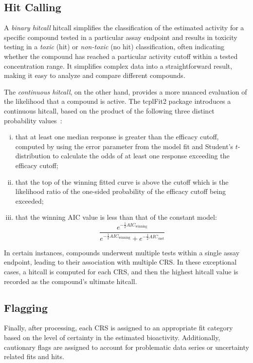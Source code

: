 \subsection{Hit Calling}
A \emph{binary hitcall} hitcall simplifies the classification of the estimated activity for a specific compound tested in a particular assay endpoint and results in toxicity testing in a \emph{toxic} (hit) or \emph{non-toxic} (no hit) classification, often indicating whether the compound has reached a particular activity cutoff within a tested concentration range. It simplifies complex data into a straightforward result, making it easy to analyze and compare different compounds.

The \emph{continuous hitcall}, on the other hand, provides a more nuanced evaluation of the likelihood that a compound is active. The tcplFit2 package introduces a continuous hitcall, based on the product of the following three distinct probability values~\cite{sheffield2021}:

\begin{enumerate}[i.]
    \item that at least one median response is greater than the efficacy cutoff, computed by using the error parameter from the model fit and Student's $t$-distribution to calculate the odds of at least one response exceeding the efficacy cutoff;
    \item that the top of the winning fitted curve is above the cutoff which is the likelihood ratio of the one-sided probability of the efficacy cutoff being exceeded;
    \item that the winning AIC value is less than that of the constant model:
    \begin{equation}
    \frac{e^{-\frac{1}{2}AIC_{\text{winning}}}}{e^{-\frac{1}{2}AIC_{\text{winning}}} + e^{-\frac{1}{2}AIC_{\text{cnst}}} }
    \end{equation}
\end{enumerate}

In certain instances, compounds underwent multiple tests within a single assay endpoint, leading to their association with multiple CRS. In these exceptional cases, a hitcall is computed for each CRS, and then the highest hitcall value is recorded as the compound's ultimate hitcall.

\subsection{Flagging}
Finally, after processing, each CRS is assigned to an appropriate fit category based on the level of certainty in the estimated bioactivity. Additionally, cautionary flags are assigned to account for problematic data series or uncertainty related fits and hits.


